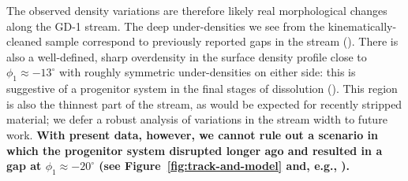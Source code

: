 \documentclass[modern]{aastex62}
\newcommand{\gaia}{\textsl{Gaia}}
\newcommand{\masyr}{\ensuremath{\textrm{mas}~\textrm{yr}^{-1}}}
\newcommand{\changes}[1]{{\textbf{#1}}}
\begin{document}
The observed density variations are therefore likely real morphological changes
along the GD-1 stream.
The deep under-densities we see from the kinematically-cleaned sample correspond
to previously reported gaps in the stream (\citealt{Carlberg:2013, DeBoer:2018}).
There is also a well-defined, sharp overdensity in the surface density profile
close to $\phi_1 \approx -13^\circ$ with roughly symmetric under-densities on
either side:
this is suggestive of a progenitor system in the final stages of dissolution
(\citealt{Balbinot:2018}).
This region is also the thinnest part of the stream, as would be expected for
recently stripped material; we defer a robust analysis of variations in the
stream width to future work.
\changes{With present data, however, we cannot rule out a scenario in which the progenitor system disrupted longer ago and resulted in a gap at $\phi_1\approx-20^\circ$ (see Figure~\ref{fig:track-and-model} and, e.g., \citealt{DeBoer:2018}).}
\end{document}
